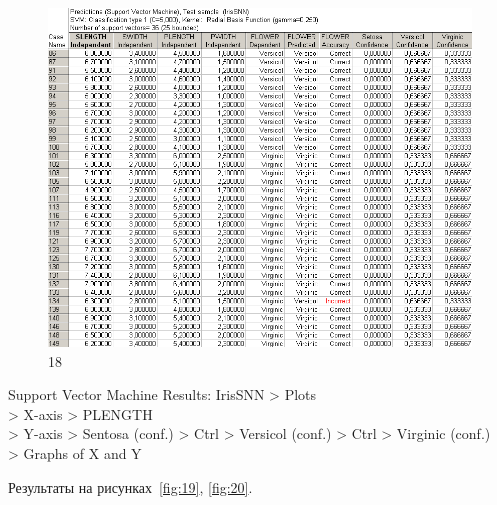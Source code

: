 \begin{figure}[!hp]
  \centering

  \includegraphics[width=14cm]
  {inc/ex_18.PNG}

  \caption{18}

  \label{fig:18}
\end{figure}

\newpage

Support Vector Machine Results: IrisSNN > Plots \\
> X-axis > PLENGTH \\
> Y-axis > Sentosa (conf.) > Ctrl > Versicol (conf.) > Ctrl > Virginic (conf.) \\
> Graphs of X and Y

Результаты на рисунках~\ref{fig:19}, \ref{fig:20}.

